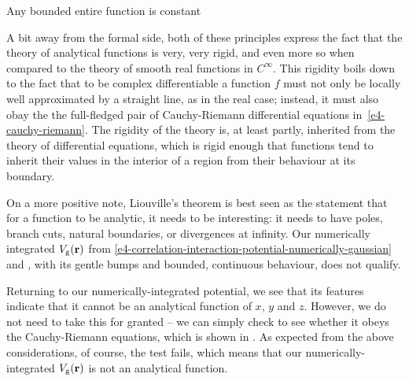 \begin{mathaside}{Any bounded entire function is constant}
\hfill\qedsymbol

\vspace{\maskip}
A bit away from the formal side, both of these principles express the fact that the theory of analytical functions is very, very rigid, and even more so when compared to the theory of smooth real functions in $C^\infty$. This rigidity boils down to the fact that to be complex differentiable a function $f$ must not only be locally well approximated by a straight line, as in the real case; instead, it must also obay the the full-fledged pair of Cauchy-Riemann differential equations in~\eqref{e4-cauchy-riemann}. The rigidity of the theory is, at least partly, inherited from the theory of differential equations, which is rigid enough that functions tend to inherit their values in the interior of a region from their behaviour at its boundary.

\vspace{\maskip}
On a more positive note, Liouville's theorem is best seen as the statement that for a function to be analytic, it needs to be interesting: it needs to have poles, branch cuts, natural boundaries, or divergences at infinity. Our numerically integrated $V_\mathrm{g}(\vb{r})$ from \eqref{e4-correlation-interaction-potential-numerically-gaussian} and , with its gentle bumps and bounded, continuous behaviour, does not qualify.



\end{mathaside}



Returning to our numerically-integrated potential, we see that its features indicate that it cannot be an analytical function of $x$, $y$ and $z$. However, we do not need to take this for granted -- we can simply check to see whether it obeys the Cauchy-Riemann equations, which is shown in . As expected from the above considerations, of course, the test fails, which means that our numerically-integrated $V_\mathrm{g}(\vb{r})$ is not an analytical function.



